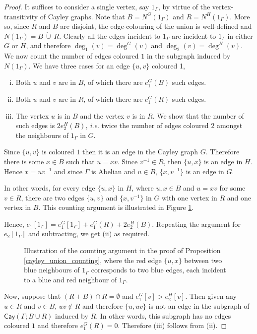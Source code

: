 \documentclass[a4paper,12pt]{article}
\newcommand{\cay}[2]{\mathsf{Cay}\left(#1 ; #2\right)}
\begin{document}
\begin{proof}
It suffices to consider a single vertex, say $1_\Gamma$, by virtue of the vertex-transitivity of Cayley graphs. Note that $B = N^G (1_\Gamma)$ and $R = N^H (1_\Gamma)$. More so, since $R$ and $B$ are disjoint, the edge-colouring of the union is well-defined and $N(1_\Gamma) = B \ \dot\cup \ R$. Clearly all the edges incident to $1_\Gamma$ are incident to $1_\Gamma$ in either $G$ or $H$, and therefore $\deg_1 (v) = \deg^G (v)$ and $\deg_2 (v) = \deg^H (v)$. We now count the number of edges coloured $1$ in the subgraph induced by $N(1_\Gamma)$. We have three cases for an edge $\{u, v\}$ coloured 1, 
\begin{enumerate}[i.]
\item Both $u$ and $v$ are in $B$, of which there are $e_1^G (B)$ such edges.
\item Both $u$ and $v$ are in $R$, of which there are $e_1^G \left(R\right)$ such edges.
\item The vertex $u$ is in $B$ and the vertex $v$ is in $R$. We show that the number of such edges is $2 e_2^H \left(B\right)$, \textit{i.e}. twice the number of edges coloured $2$ amongst the neighbours of $1_\Gamma$ in $G$.
\end{enumerate}

Since $\{u, v\}$ is coloured $1$ then it is an edge in the Cayley graph $G$. Therefore there is some $x \in B$ such that $u = xv$. Since $v^{-1} \in R$, then $\{u, x\}$ is an edge in $H$. Hence $x = u v^{-1}$ and since $\Gamma$ is Abelian and $u \in B$, $\{x, v^{-1}\}$ is an edge in $G$.

In other words, for every edge $\{u, x\}$ in $H$, where $u, x \in B$ and $u = xv$ for some $v \in R$, there are two edges $\{u, v\}$ and $\{x, v^{-1}\}$ in $G$ with one vertex in $R$ and one vertex in $B$. This counting argument is illustrated in Figure \ref{cayley_union_counting_fig}.

Hence, $e_1 [1_\Gamma] = e_1^G [1_\Gamma] + e_1^G \left(R\right) + 2 e_2^H \left(B\right)$. Repeating the argument for $e_2 [1_\Gamma]$ and subtracting, we get (ii) as required.

\begin{figure}[t!]
\centering
{}
\caption{Illustration of the counting argument in the proof of Proposition \ref{cayley_union_counting}, where the red edge $\{u, x\}$ between two blue neighbours of $1_\Gamma$ corresponds to two blue edges, each incident to a blue and red neighbour of $1_\Gamma$.}
\label{cayley_union_counting_fig}
\end{figure}

Now, suppose that $(R + B) \cap R = \emptyset$ and $e_1^G [v] > e_2^H [v]$. Then given any $u \in R$ and $v \in B$, $uv \notin R$ and therefore $\{u, uv\}$ is not an edge in the subgraph of $\cay{\Gamma}{B \cup R}$ induced by $R$. In other words, this subgraph has no edges coloured $1$ and therefore $e^G_1 \left(R\right) = 0$. Therefore (iii) follows from (ii). 
\end{proof}
\end{document}

